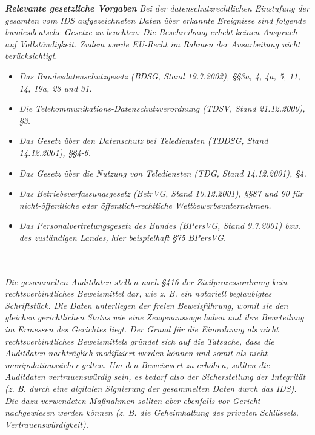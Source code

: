 \documentclass[11pt]{scrartcl}
\begin{document}
\textbf{\textit{Relevante gesetzliche Vorgaben}}
\textit{Bei der datenschutzrechtlichen Einstufung der gesamten vom IDS aufgezeichneten Daten über erkannte Ereignisse sind folgende bundesdeutsche Gesetze zu beachten: Die Beschreibung erhebt keinen Anspruch auf Vollständigkeit. Zudem wurde EU-Recht im Rahmen der Ausarbeitung nicht berücksichtigt.}\\
\begin{itemize}
\item \textit{Das Bundesdatenschutzgesetz (BDSG, Stand 19.7.2002), §§3a, 4, 4a, 5, 11, 14, 19a, 28 und 31.}
\item \textit{Die Telekommunikations-Datenschutzverordnung (TDSV, Stand 21.12.2000), §3.}
\item \textit{Das Gesetz über den Datenschutz bei Telediensten (TDDSG, Stand 14.12.2001), §§4-6.}
\item \textit{Das Gesetz über die Nutzung von Telediensten (TDG, Stand 14.12.2001), §4.}
\item \textit{Das Betriebsverfassungsgesetz (BetrVG, Stand 10.12.2001), §§87 und 90 für nicht-öffentliche oder öffentlich-rechtliche Wettbewerbsunternehmen.}
\item \textit{Das Personalvertretungsgesetz des Bundes (BPersVG, Stand 9.7.2001) bzw. des zuständigen Landes, hier beispielhaft §75 BPersVG.}\grqq{}
\end{itemize}
\cite{9}\\\\
\grqq{}\textit{Die gesammelten Auditdaten stellen nach §416 der Zivilprozessordnung kein rechtsverbindliches Beweismittel dar, wie z. B. ein notariell beglaubigtes Schriftstück. Die Daten unterliegen der freien Beweisführung, womit sie den gleichen gerichtlichen Status wie eine Zeugenaussage haben und ihre Beurteilung im Ermessen des Gerichtes liegt. Der Grund für die Einordnung als nicht rechtsverbindliches Beweismittels gründet sich auf die Tatsache, dass die Auditdaten nachträglich modifiziert werden können und somit als nicht manipulationssicher gelten. Um den Beweiswert zu erhöhen, sollten die Auditdaten vertrauenswürdig sein, es bedarf also der Sicherstellung der Integrität (z. B. durch eine digitalen Signierung der gesammelten Daten durch das IDS). Die dazu verwendeten Maßnahmen sollten aber ebenfalls vor Gericht nachgewiesen werden können (z. B. die Geheimhaltung des privaten Schlüssels, Vertrauenswürdigkeit).}\grqq{}
\cite{6}
\end{document}
